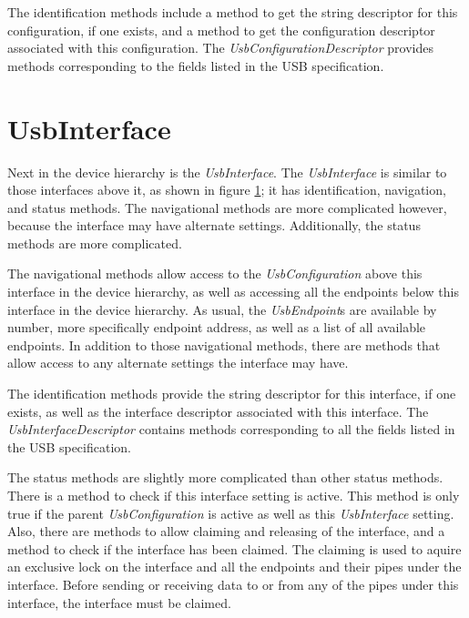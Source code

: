 \documentclass{article}
\newcommand{\myinterface}[1]{\emph{#1}}
\newcommand{\mysectionend}[0]{\vfill\pagebreak[1]}
\begin{document}
The identification methods include a method to get the string
descriptor for this configuration, if one exists, and a method to get
the configuration descriptor associated with this configuration.  The
\myinterface{UsbConfigurationDescriptor} provides methods corresponding to the fields
listed in the USB specification.

\mysectionend

%

\section{UsbInterface}

Next in the device hierarchy is the \myinterface{UsbInterface}.  The \myinterface{UsbInterface} is
similar to those interfaces above it, as shown in figure \ref{UsbInterface};
it has identification, navigation, and status methods.  The navigational
methods are more complicated however, because the interface may have
alternate settings.  Additionally, the status methods are more complicated.

\begin{figure}
\label{UsbInterface}
\end{figure}

The navigational methods allow access to the \myinterface{UsbConfiguration} above this
interface in the device hierarchy, as well as accessing all the
endpoints below this interface in the device hierarchy.  As usual, the
\myinterface{UsbEndpoint}s are available by number, more specifically endpoint address,
as well as a list of all available endpoints.  In addition to those
navigational methods, there are methods that allow access to any alternate
settings the interface may have.

The identification methods provide the string descriptor for this interface,
if one exists, as well as the interface descriptor associated with this interface.
The \myinterface{UsbInterfaceDescriptor} contains methods corresponding to all the fields
listed in the USB specification.

The status methods are slightly more complicated than other status methods.
There is a method to check if this interface setting is active.  This
method is only true if the parent \myinterface{UsbConfiguration} is active as well as
this \myinterface{UsbInterface} setting.  Also, there are methods to allow claiming
and releasing of the interface, and a method to check if the interface
has been claimed.  The claiming is used to aquire an exclusive lock
on the interface and all the endpoints and their pipes under the interface.
Before sending or receiving data to or from any of the pipes under
this interface, the interface must be claimed.
\end{document}
